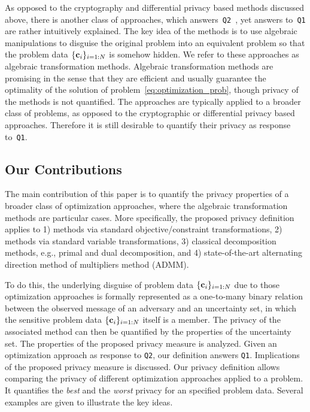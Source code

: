 \documentclass[12pt,draftcls,onecolumn]{IEEEtran}
\renewcommand{\vec}[1]{\bf{#1}}     \newcommand{\vecsc}[1]{\mbox {\boldmath \scriptsize $#1$}}     \newcommand{\itvec}[1]{\mbox {\boldmath $#1$}}
\newcommand{\addnew}[1]{{{\color{blue!0!black}#1}}}
\begin{document}
\addnew{
As opposed to the cryptography and differential privacy based methods discussed above, there is another class of approaches, which answers~\texttt{Q2}~\cite{Mangasarian-OptLet-2011,Mangasarian-OptMethSW-2011,Mangasarian-OptLet-2012,Mangasarian-Wild-2008,Mangasarian-Wild-Fung-2008,Bednarz-2012,Dreier-Kerschbaum-2011,Bednarz-Bean-Roughan-2009,Wang-Ren-Wang-11}, yet answers to~\texttt{Q1} are rather intuitively explained. The key idea of the methods is to use algebraic manipulations to disguise the original problem into an equivalent problem so that the problem data $\{{\vec c}_i\}_{i=1:N}$ is somehow hidden. We refer to these approaches as algebraic transformation methods. Algebraic transformation methods are promising in the sense that they are efficient and usually guarantee the optimality of the solution of problem~\eqref{eq:optimization_prob}, though privacy of the methods is not quantified. The approaches are typically applied to a broader class of problems, as opposed to the cryptographic or differential privacy based approaches. Therefore it is still desirable to quantify their privacy as response to~\texttt{Q1}.
}




\subsection{Our Contributions}


\addnew{The main contribution of this paper is to quantify the privacy properties of a broader class of optimization approaches, where the algebraic transformation methods  are particular cases. More specifically, the proposed privacy definition applies to 1) methods via standard objective/constraint transformations, 2) methods via standard variable transformations, 3) classical decomposition methods, e.g., primal and dual decomposition, and 4) state-of-the-art alternating direction method of multipliers method (ADMM).}


\addnew{To do this, the underlying disguise of problem data $\{{\vec c}_i\}_{i=1:N}$ due to those optimization approaches is formally represented as a one-to-many binary relation between the observed message of an adversary and an uncertainty set, in which the sensitive problem data $\{{\vec c}_i\}_{i=1:N}$ itself is a member. The privacy of the associated method can then be quantified by the properties of the uncertainty set. The properties of the proposed privacy measure is analyzed. Given an optimization approach as response to \texttt{Q2}, our definition answers \texttt{Q1}. Implications of the proposed privacy measure is discussed. Our privacy definition allows comparing the privacy of different optimization approaches applied to a problem. It quantifies the \emph{best} and the \emph{worst} privacy for an specified problem data. Several examples are given to illustrate the key ideas.}
\end{document}
